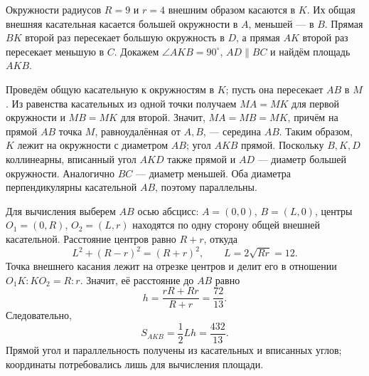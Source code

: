 \begin{example}\label{ex:review-ege-targeted-tangent-circles}
Окружности радиусов \(R=9\) и \(r=4\) внешним образом касаются в \(K\). Их общая внешняя касательная касается большей окружности в \(A\), меньшей --- в \(B\). Прямая \(BK\) второй раз пересекает большую окружность в \(D\), а прямая \(AK\) второй раз пересекает меньшую в \(C\). Докажем \(\angle AKB=90^\circ\), \(AD\parallel BC\) и найдём площадь \(AKB\).

Проведём общую касательную к окружностям в \(K\); пусть она пересекает \(AB\) в \(M\). Из равенства касательных из одной точки получаем \(MA=MK\) для первой окружности и \(MB=MK\) для второй. Значит, \(MA=MB=MK\), причём на прямой \(AB\) точка \(M\), равноудалённая от \(A,B\), --- середина \(AB\). Таким образом, \(K\) лежит на окружности с диаметром \(AB\); угол \(AKB\) прямой. Поскольку \(B,K,D\) коллинеарны, вписанный угол \(AKD\) также прямой и \(AD\) --- диаметр большей окружности. Аналогично \(BC\) --- диаметр меньшей. Оба диаметра перпендикулярны касательной \(AB\), поэтому параллельны.

Для вычисления выберем \(AB\) осью абсцисс: \(A=(0,0)\), \(B=(L,0)\), центры \(O_1=(0,R)\), \(O_2=(L,r)\) находятся по одну сторону общей внешней касательной. Расстояние центров равно \(R+r\), откуда
\[
L^2+(R-r)^2=(R+r)^2,
\qquad L=2\sqrt{Rr}=12.
\]
Точка внешнего касания лежит на отрезке центров и делит его в отношении \(O_1K:KO_2=R:r\). Значит, её расстояние до \(AB\) равно
\[
h=\frac{rR+Rr}{R+r}=\frac{72}{13}.
\]
Следовательно,
\[
S_{AKB}=\frac12Lh=\frac{432}{13}.
\]
Прямой угол и параллельность получены из касательных и вписанных углов; координаты потребовались лишь для вычисления площади.
\end{example}


